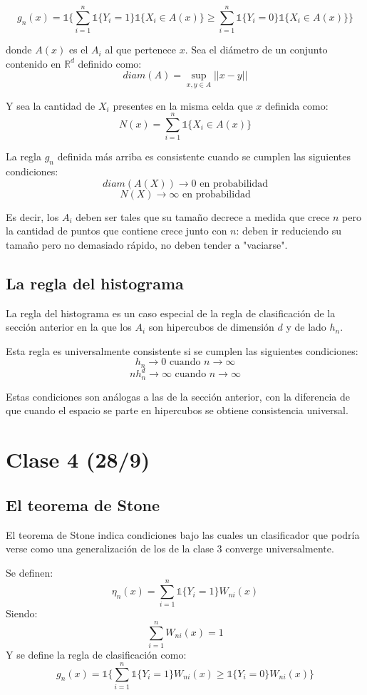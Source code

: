 \documentclass[12pt, a4paper]{article}
\begin{document}
$$g_n(x)=\mathds{1}\bigg \{ \mathop{\sum}_{i=1}^{n} \mathds{1}\{Y_i=1\} \mathds{1}\{X_i \in A(x)\} \geq \mathop{\sum}_{i=1}^{n} \mathds{1}\{Y_i=0\} \mathds{1}\{X_i \in A(x)\} \bigg \}$$

donde $A(x)$ es el $A_i$ al que pertenece $x$.
Sea el diámetro de un conjunto contenido en $\mathds{R}^d$ definido como:
$$diam(A)=\mathop{sup}_{x,y \in A} || x-y||$$

Y sea la cantidad de $X_i$ presentes en la misma celda que $x$ definida como:
$$N(x)=\mathop{\sum}_{i=1}^{n}\mathds{1}\{ X_i \in A(x) \}$$

La regla $g_n$ definida más arriba es consistente cuando se cumplen las siguientes condiciones:
$$diam(A(X))\rightarrow 0 \text{ en probabilidad}$$
$$N(X)\rightarrow \infty \text{ en probabilidad}$$

Es decir, los $A_i$ deben ser tales que su tamaño decrece a medida que crece $n$ pero la cantidad de puntos que contiene crece junto con $n$: deben ir reduciendo su tamaño pero no demasiado rápido, no deben tender a "vaciarse".

\subsection{La regla del histograma}
La regla del histograma es un caso especial de la regla de clasificación de la sección anterior en la que los $A_i$ son hipercubos de dimensión $d$ y de lado $h_n$.

Esta regla es universalmente consistente si se cumplen las siguientes condiciones:
$$h_n \rightarrow 0 \text{ cuando } n\rightarrow \infty$$
$$nh_n^d \rightarrow \infty \text{ cuando } n\rightarrow \infty$$

Estas condiciones son análogas a las de la sección anterior, con la diferencia de que cuando el espacio se parte en hipercubos se obtiene consistencia universal.

\section{Clase 4 (28/9)}
\subsection{El teorema de Stone}
El teorema de Stone indica condiciones bajo las cuales un clasificador que podría verse como una generalización de los de la clase 3 converge universalmente.

Se definen:
$$ \eta_n(x)=\mathop{\sum}_{i=1}^{n} \mathds{1}\{Y_i=1\} W_{ni}(x) $$
Siendo:
$$ \sum_{i=1}^n W_{ni}(x)=1 $$
Y se define la regla de clasificación como:
$$ g_n(x) = \mathds{1}\bigg \{ \sum_{i=1}^n \mathds{1}\{Y_i=1\} W_{ni}(x) \geq \mathds{1}\{Y_i=0\} W_{ni}(x) \bigg \} $$
\end{document}
